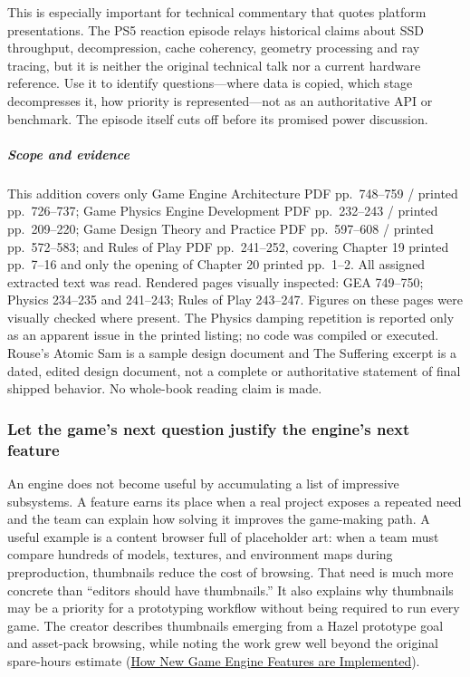 This is especially important for technical commentary that quotes platform presentations. The PS5 reaction episode relays historical claims about SSD throughput, decompression, cache coherency, geometry processing and ray tracing, but it is neither the original technical talk nor a current hardware reference. Use it to identify questions---where data is copied, which stage decompresses it, how priority is represented---not as an authoritative API or benchmark. The episode itself cuts off before its promised power discussion.

\subparagraph{Scope and evidence}\label{06-engine-ii-ch041-scope-and-evidence}

\hypertarget{06-engine-ii-ch041-scope-and-evidence}{}

This addition covers only Game Engine Architecture PDF pp.~748--759 / printed pp.~726--737; Game Physics Engine Development PDF pp.~232--243 / printed pp.~209--220; Game Design Theory and Practice PDF pp.~597--608 / printed pp.~572--583; and Rules of Play PDF pp.~241--252, covering Chapter 19 printed pp.~7--16 and only the opening of Chapter 20 printed pp.~1--2. All assigned extracted text was read. Rendered pages visually inspected: GEA 749--750; Physics 234--235 and 241--243; Rules of Play 243--247. Figures on these pages were visually checked where present. The Physics damping repetition is reported only as an apparent issue in the printed listing; no code was compiled or executed. Rouse's Atomic Sam is a sample design document and The Suffering excerpt is a dated, edited design document, not a complete or authoritative statement of final shipped behavior. No whole-book reading claim is made.

\subsubsection{Let the game's next question justify the engine's next feature}\label{06-engine-ii-ch041-let-the-games-next-question-justify-the-engines-next-feature}

\hypertarget{06-engine-ii-ch041-let-the-games-next-question-justify-the-engines-next-feature}{}

An engine does not become useful by accumulating a list of impressive subsystems. A feature earns its place when a real project exposes a repeated need and the team can explain how solving it improves the game-making path. A useful example is a content browser full of placeholder art: when a team must compare hundreds of models, textures, and environment maps during preproduction, thumbnails reduce the cost of browsing. That need is much more concrete than ``editors should have thumbnails.'' It also explains why thumbnails may be a priority for a prototyping workflow without being required to run every game. The creator describes thumbnails emerging from a Hazel prototype goal and asset-pack browsing, while noting the work grew well beyond the original spare-hours estimate (\href{https://www.youtube.com/watch?v=z1O6AZWuWm4&t=8m54s}{How New Game Engine Features are Implemented}).


